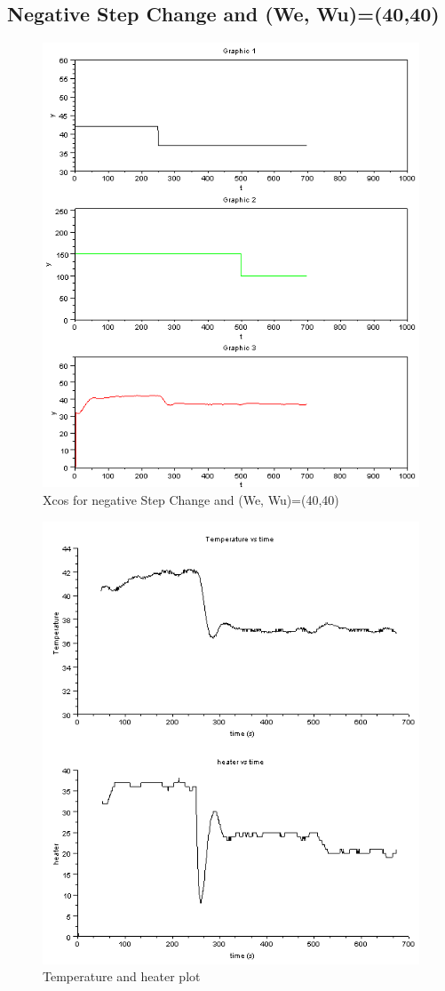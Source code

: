 \subsection{Negative Step Change and (We, Wu)=(40,40)}
\begin{figure}[H]
\centering
 \includegraphics[width=0.8\linewidth]{mpc/2_3.PNG}
  \caption{Xcos for negative Step Change and (We, Wu)=(40,40)}
\end{figure}
\begin{figure}[H]
\centering
  \includegraphics[width=0.8\linewidth]{mpc/2_3_heater_final.png}
  \caption{Temperature and heater plot}
\end{figure}


